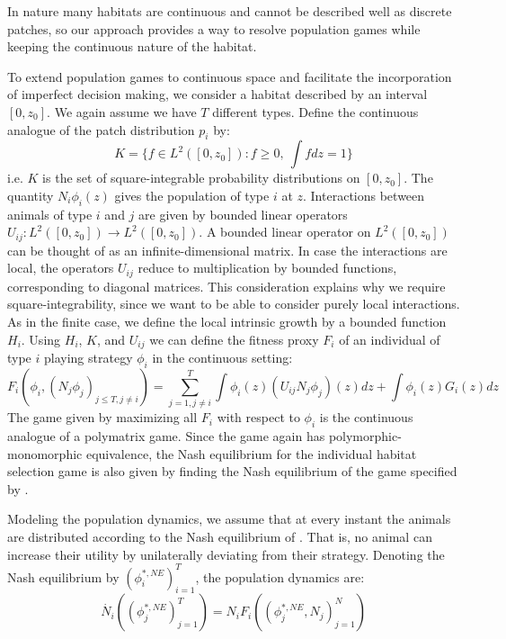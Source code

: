 In nature many habitats are continuous and cannot be described well as discrete patches, so our approach provides a way to resolve population games while keeping the continuous nature of the habitat.

To extend population games to continuous space and facilitate the incorporation of imperfect decision making, we consider a habitat described by an interval $[0,z_0]$. We again assume we have $T$ different types. Define the continuous analogue of the patch distribution $p_i$ by:
\begin{equation}
  K = \{ f \in L^2([0,z_0]) : f \geq 0,~\int f dz = 1\}
  \label{eq:space_of_dists}
\end{equation}
i.e. $K$ is the set of square-integrable probability distributions on $[0,z_0]$. The quantity $N_i \phi_i(z)$ gives the population of type $i$ at $z$. Interactions between animals of type $i$ and $j$ are given by bounded linear operators $U_{ij}: L^2([0,z_0]) \to L^2([0,z_0])$. A bounded linear operator on $L^2([0,z_0])$ can be thought of as an infinite-dimensional matrix. In case the interactions are local, the operators $U_{ij}$ reduce to multiplication by bounded functions, corresponding to diagonal matrices. This consideration explains why we require square-integrability, since we want to be able to consider purely local interactions. As in the finite case, we define the local intrinsic growth by a bounded function $H_i$. Using $H_i$, $K$, and $U_{ij}$ we can define the fitness proxy $F_i$ of an individual of type $i$ playing strategy $\phi_i$ in the continuous setting:
\begin{equation}
  F_i(\phi_i, (N_j \phi_j)_{j \leq T, j \neq i}) = \sum_{j=1,j\neq i}^T \int \phi_i(z) (U_{ij}N_j \phi_j)(z) dz + \int \phi_i(z) G_i(z) dz %
  \label{eq:utility}
\end{equation}
The game given by maximizing all $F_i$ with respect to $\phi_i$ is the continuous analogue of a polymatrix game. Since the game again has polymorphic-monomorphic equivalence, the Nash equilibrium for the individual habitat selection game is also given by finding the Nash equilibrium of the game specified by .

Modeling the population dynamics, we assume that at every instant the animals are distributed according to the Nash equilibrium of . That is, no animal can increase their utility by unilaterally deviating from their strategy. Denoting the Nash equilibrium by $(\phi_i^{*,NE})^T_{i=1}$, the population dynamics are:
\begin{equation}
  \dot{N_i}((\phi_j^{*,NE})_{j=1}^T ) = N_i F_i((\phi_j^{*,NE}, N_j)_{j=1}^N)
\end{equation}


